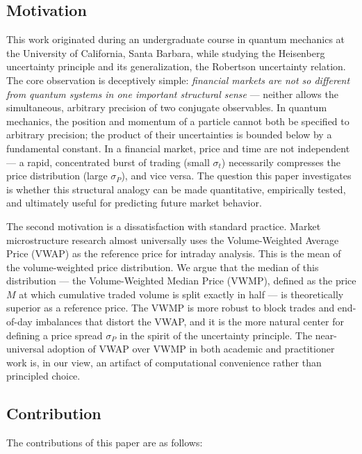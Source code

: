 \documentclass[11pt]{article}
\begin{document}
\subsection{Motivation}

This work originated during an undergraduate course in quantum mechanics at the University of California, Santa Barbara, while studying the Heisenberg uncertainty principle and its generalization, the Robertson uncertainty relation. The core observation is deceptively simple: \textit{financial markets are not so different from quantum systems in one important structural sense} --- neither allows the simultaneous, arbitrary precision of two conjugate observables. In quantum mechanics, the position and momentum of a particle cannot both be specified to arbitrary precision; the product of their uncertainties is bounded below by a fundamental constant. In a financial market, price and time are not independent --- a rapid, concentrated burst of trading (small $\sigma_t$) necessarily compresses the price distribution (large $\sigma_P$), and vice versa. The question this paper investigates is whether this structural analogy can be made quantitative, empirically tested, and ultimately useful for predicting future market behavior.

The second motivation is a dissatisfaction with standard practice. Market microstructure research almost universally uses the Volume-Weighted Average Price (VWAP) as the reference price for intraday analysis. This is the mean of the volume-weighted price distribution. We argue that the median of this distribution --- the Volume-Weighted Median Price (VWMP), defined as the price $M$ at which cumulative traded volume is split exactly in half --- is theoretically superior as a reference price. The VWMP is more robust to block trades and end-of-day imbalances that distort the VWAP, and it is the more natural center for defining a price spread $\sigma_P$ in the spirit of the uncertainty principle. The near-universal adoption of VWAP over VWMP in both academic and practitioner work is, in our view, an artifact of computational convenience rather than principled choice.

\subsection{Contribution}

The contributions of this paper are as follows:
\end{document}
